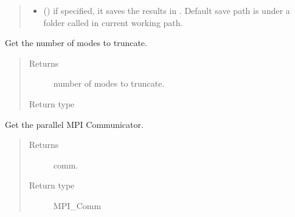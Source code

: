 \documentclass[letterpaper,10pt,english]{sphinxmanual}
\begin{document}
\begin{fulllineitems}
\begin{quote}
\begin{description}
\begin{itemize}
\item {} 
\sphinxAtStartPar
{} () \textendash{} if specified, it saves the results in .            Default save path is under a folder called  in current working path.

\end{itemize}

\end{description}\end{quote}

\begin{fulllineitems}
\label{\detokenize{index:pyparsvd.parsvd_base.ParSVD_Base.K}}
\sphinxAtStartPar
Get the number of modes to truncate.
\begin{quote}\begin{description}
\item[{Returns}] \leavevmode
\sphinxAtStartPar
number of modes to truncate.

\item[{Return type}] \leavevmode
\sphinxAtStartPar
{}

\end{description}\end{quote}

\end{fulllineitems}


\begin{fulllineitems}
\label{\detokenize{index:pyparsvd.parsvd_base.ParSVD_Base.comm}}
\sphinxAtStartPar
Get the parallel MPI Communicator.
\begin{quote}\begin{description}
\item[{Returns}] \leavevmode
\sphinxAtStartPar
comm.

\item[{Return type}] \leavevmode
\sphinxAtStartPar
MPI\_Comm


\end{description}
\end{quote}
\end{fulllineitems}
\end{fulllineitems}
\end{document}
